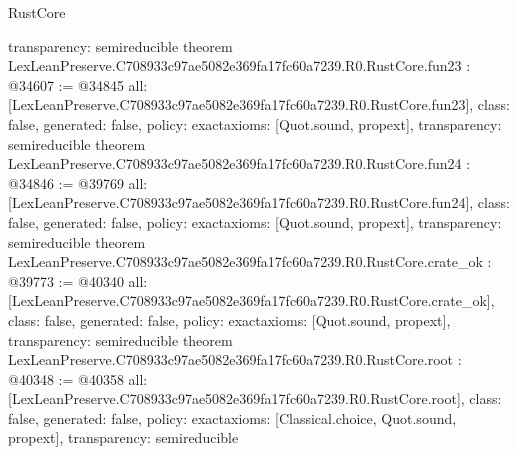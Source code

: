 \begin{lexlean}{RustCore}
\begin{coremodule}
{  transparency: semireducible
}
theorem LexLeanPreserve.C708933c97ae5082e369fa17fc60a7239.R0.RustCore.fun23 : @34607 := @34845 {
  all: [LexLeanPreserve.C708933c97ae5082e369fa17fc60a7239.R0.RustCore.fun23],
  class: false,
  generated: false,
  policy: exact{axioms: [Quot.sound, propext]},
  transparency: semireducible
}
theorem LexLeanPreserve.C708933c97ae5082e369fa17fc60a7239.R0.RustCore.fun24 : @34846 := @39769 {
  all: [LexLeanPreserve.C708933c97ae5082e369fa17fc60a7239.R0.RustCore.fun24],
  class: false,
  generated: false,
  policy: exact{axioms: [Quot.sound, propext]},
  transparency: semireducible
}
theorem LexLeanPreserve.C708933c97ae5082e369fa17fc60a7239.R0.RustCore.crate_ok : @39773 := @40340 {
  all: [LexLeanPreserve.C708933c97ae5082e369fa17fc60a7239.R0.RustCore.crate_ok],
  class: false,
  generated: false,
  policy: exact{axioms: [Quot.sound, propext]},
  transparency: semireducible
}
theorem LexLeanPreserve.C708933c97ae5082e369fa17fc60a7239.R0.RustCore.root : @40348 := @40358 {
  all: [LexLeanPreserve.C708933c97ae5082e369fa17fc60a7239.R0.RustCore.root],
  class: false,
  generated: false,
  policy: exact{axioms: [Classical.choice, Quot.sound, propext]},
  transparency: semireducible
}


\end{coremodule}
\end{lexlean}
